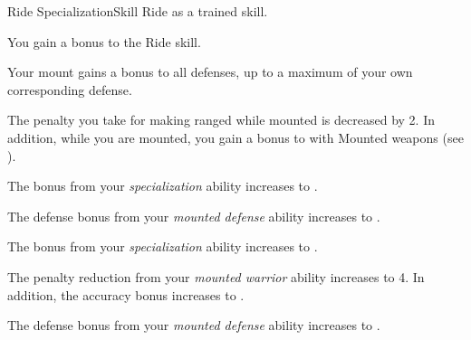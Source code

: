    \begin{feat}{Ride Specialization}{Skill}
        \featpre Ride as a trained skill.

         You gain a  bonus to the Ride skill.

         Your mount gains a  bonus to all defenses, up to a maximum of your own corresponding defense.

         The penalty you take for making ranged  while mounted is decreased by 2.
        In addition, while you are mounted, you gain a  bonus to  with Mounted weapons (see ).

         The bonus from your \textit{specialization} ability increases to .

         The defense bonus from your \textit{mounted defense} ability increases to .

         The bonus from your \textit{specialization} ability increases to .

         The penalty reduction from your \textit{mounted warrior} ability increases to 4.
        In addition, the accuracy bonus increases to .

         The defense bonus from your \textit{mounted defense} ability increases to .
    \end{feat}

